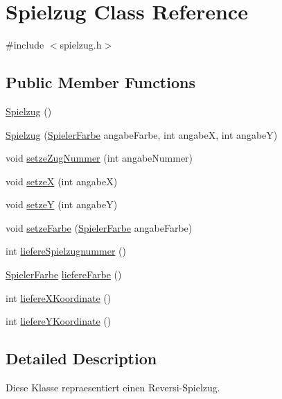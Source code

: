 \hypertarget{classSpielzug}{\section{Spielzug Class Reference}
\label{classSpielzug}
}


{\ttfamily \#include $<$spielzug.\-h$>$}

\subsection*{Public Member Functions}
\begin{DoxyCompactItemize}
\item 
\hyperlink{classSpielzug_a7b7aad35bfc1043c525ccfc4c20e11ed}{Spielzug} ()
\item 
\hyperlink{classSpielzug_a89e6a868824fb8649a1a7d29df1243cd}{Spielzug} (\hyperlink{DEFINE_8h_af7777a498318335ea89b85bdc0d1651f}{Spieler\-Farbe} angabe\-Farbe, int angabe\-X, int angabe\-Y)
\item 
void \hyperlink{classSpielzug_ab0a39c9bdb4363adf8429d742206924d}{setze\-Zug\-Nummer} (int angabe\-Nummer)
\item 
void \hyperlink{classSpielzug_a7c9f2dfadd0cc1cc18f80047f9a9a52b}{setze\-X} (int angabe\-X)
\item 
void \hyperlink{classSpielzug_acd296673dd7225784b6362dd6b87adc2}{setze\-Y} (int angabe\-Y)
\item 
void \hyperlink{classSpielzug_a6fc38e0019c2cf6172a0fde10fd80f6d}{setze\-Farbe} (\hyperlink{DEFINE_8h_af7777a498318335ea89b85bdc0d1651f}{Spieler\-Farbe} angabe\-Farbe)
\item 
int \hyperlink{classSpielzug_a2864a33ceefc5059c2fe2b72d37caf26}{liefere\-Spielzugnummer} ()
\item 
\hyperlink{DEFINE_8h_af7777a498318335ea89b85bdc0d1651f}{Spieler\-Farbe} \hyperlink{classSpielzug_a4631d54708350591492b9c0a48e52dd4}{liefere\-Farbe} ()
\item 
int \hyperlink{classSpielzug_ad6fecfb5347477854c29a96b7aced58f}{liefere\-X\-Koordinate} ()
\item 
int \hyperlink{classSpielzug_a0952a01306c666d25ba4f5275875fe1a}{liefere\-Y\-Koordinate} ()
\end{DoxyCompactItemize}


\subsection{Detailed Description}
Diese Klasse repraesentiert einen Reversi-\/\-Spielzug. 

